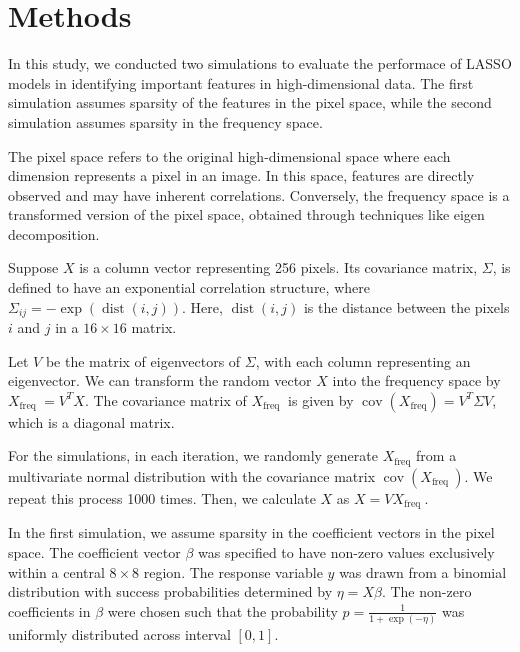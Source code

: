 \documentclass[12pt]{article}
\begin{document}
\section*{Methods}

In this study, we conducted two simulations to evaluate the performace of LASSO
models in identifying important features in high-dimensional data. The first
simulation assumes sparsity of the features in the pixel space, while the
second simulation assumes sparsity in the frequency space.

The pixel space refers to the original high-dimensional space where each
dimension represents a pixel in an image. In this space, features are directly
observed and may have inherent correlations. Conversely, the frequency space is
a transformed version of the pixel space, obtained through techniques like
eigen decomposition.

Suppose \( X \) is a column vector representing 256 pixels. Its covariance
matrix, \( \Sigma \), is defined to have an exponential correlation structure,
where \( \Sigma_{i j}=-\exp (\operatorname{dist}(i, j)) \). Here, \(
\operatorname{dist}(i, j) \) is the distance between the pixels \( i \) and \(
j \) in a \( 16 \times 16 \) matrix.

Let \( V \) be the matrix of eigenvectors of \( \Sigma \), with each column
representing an eigenvector. We can transform the random vector \( X \) into
the frequency space by \( X_{\text {freq }}=V^T X \). The covariance matrix of
\( X_{\text {freq }} \) is given by \(
\operatorname{cov}\left(X_{\mathrm{freq}}\right)=V^T \Sigma V \), which is a
diagonal matrix.

For the simulations, in each iteration, we randomly generate \( X_{\text {freq
}} \) from a multivariate normal distribution with the covariance matrix
\(\operatorname{cov}\left(X_{\text {freq }}\right) \). We repeat this process
1000 times. Then, we calculate \( X \) as \( X=V X_{\text {freq }} \).

In the first simulation, we assume sparsity in the coefficient vectors in the
pixel space. The coefficient vector \( \beta \) was specified to have non-zero
values exclusively within a central \( 8 \times 8 \) region. The response
variable \( y \) was drawn from a binomial distribution with success
probabilities determined by \( \eta = X \beta \). The non-zero coefficients in
\( \beta \) were chosen such that the probability \( p = \frac{1}{1 +
\exp(-\eta)} \) was uniformly distributed across interval \( [0, 1] \).
\end{document}

